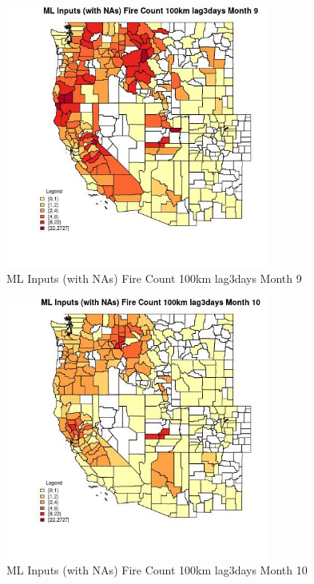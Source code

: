 \begin{figure} 
\centering  
\includegraphics[width=0.77\textwidth]{Code_Outputs/Report_ML_input_PM25_Step4_part_f_de_duplicated_aves_prioritize_24hr_obswNAs_CountyFire_Count_100km_lag3daysmedianMonth9.jpg} 
\caption{\label{fig:Report_ML_input_PM25_Step4_part_f_de_duplicated_aves_prioritize_24hr_obswNAsCountyFire_Count_100km_lag3daysmedianMonth9}ML Inputs (with NAs) Fire Count 100km lag3days Month 9} 
\end{figure} 
 

\begin{figure} 
\centering  
\includegraphics[width=0.77\textwidth]{Code_Outputs/Report_ML_input_PM25_Step4_part_f_de_duplicated_aves_prioritize_24hr_obswNAs_CountyFire_Count_100km_lag3daysmedianMonth10.jpg} 
\caption{\label{fig:Report_ML_input_PM25_Step4_part_f_de_duplicated_aves_prioritize_24hr_obswNAsCountyFire_Count_100km_lag3daysmedianMonth10}ML Inputs (with NAs) Fire Count 100km lag3days Month 10} 
\end{figure} 
 

